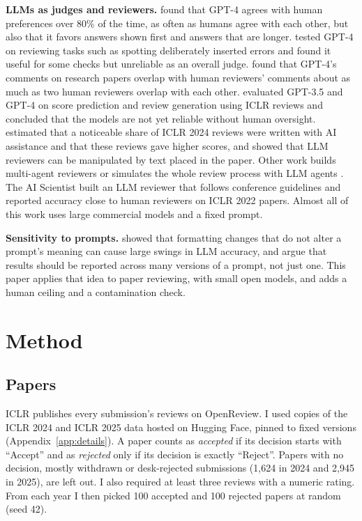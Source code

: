 \documentclass[11pt]{article}
\begin{document}
\textbf{LLMs as judges and reviewers.}
\citet{zheng2023judging} found that GPT-4 agrees with human preferences over 80\% of the time, as often as humans agree with each other, but also that it favors answers shown first and answers that are longer. \citet{liu2023reviewergpt} tested GPT-4 on reviewing tasks such as spotting deliberately inserted errors and found it useful for some checks but unreliable as an overall judge. \citet{liang2023feedback} found that GPT-4's comments on research papers overlap with human reviewers' comments about as much as two human reviewers overlap with each other. \citet{zhou2024reliable} evaluated GPT-3.5 and GPT-4 on score prediction and review generation using ICLR reviews and concluded that the models are not yet reliable without human oversight. \citet{latona2024lottery} estimated that a noticeable share of ICLR 2024 reviews were written with AI assistance and that these reviews gave higher scores, and \citet{ye2024arewethere} showed that LLM reviewers can be manipulated by text placed in the paper. Other work builds multi-agent reviewers \citep{darcy2024marg} or simulates the whole review process with LLM agents \citep{jin2024agentreview}. The AI Scientist \citep{lu2024aiscientist} built an LLM reviewer that follows conference guidelines and reported accuracy close to human reviewers on ICLR 2022 papers. Almost all of this work uses large commercial models and a fixed prompt.

\textbf{Sensitivity to prompts.}
\citet{sclar2023quantifying} showed that formatting changes that do not alter a prompt's meaning can cause large swings in LLM accuracy, and \citet{mizrahi2024state} argue that results should be reported across many versions of a prompt, not just one. This paper applies that idea to paper reviewing, with small open models, and adds a human ceiling and a contamination check.

\section{Method}

\subsection{Papers}
ICLR publishes every submission's reviews on OpenReview. I used copies of the ICLR 2024 and ICLR 2025 data hosted on Hugging Face, pinned to fixed versions (Appendix~\ref{app:details}). A paper counts as \emph{accepted} if its decision starts with ``Accept'' and as \emph{rejected} only if its decision is exactly ``Reject''. Papers with no decision, mostly withdrawn or desk-rejected submissions (1,624 in 2024 and 2,945 in 2025), are left out. I also required at least three reviews with a numeric rating. From each year I then picked 100 accepted and 100 rejected papers at random (seed 42).
\end{document}
